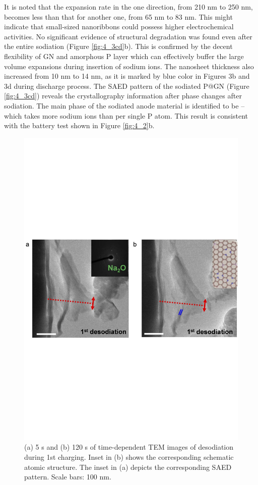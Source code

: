 It is noted that the expansion rate in the one direction, from 210 nm to 250 nm, becomes less than that for another one, from 65 nm to 83 nm. This might indicate that small-sized nanoribbons could possess higher electrochemical activities. 
No significant evidence of structural degradation was found even after the entire sodiation (Figure \ref{fig:4_3cd}b). This is confirmed by the decent flexibility of GN and amorphous P layer which can effectively buffer the large volume expansions during insertion of sodium ions. 
The nanosheet thickness also increased from 10 nm to 14 nm, as it is marked by blue color in Figures 3b and 3d during discharge process. 
The SAED pattern of the sodiated P@GN (Figure \ref{fig:4_3cd}) reveals the crystallography information after phase changes after sodiation. 
The main phase of the sodiated anode material is identified to be  -- which takes more sodium ions than  per single P atom. This result is consistent with the battery test shown in Figure \ref{fig:4_2}b. 

\begin{figure}  
\includegraphics[width=\textwidth,angle=0]{figures/figure4_3ef}
\caption[{\it In situ} desodiation process on P@GN SIB]
{
  (a) 5 s and (b) 120 s of time-dependent TEM images of desodiation during 1st charging. Inset in (b) shows the corresponding schematic atomic structure. The inset in (a) depicts the corresponding SAED pattern. Scale bars: 100 nm.
\label{fig:4_3ef}}
\end{figure}

